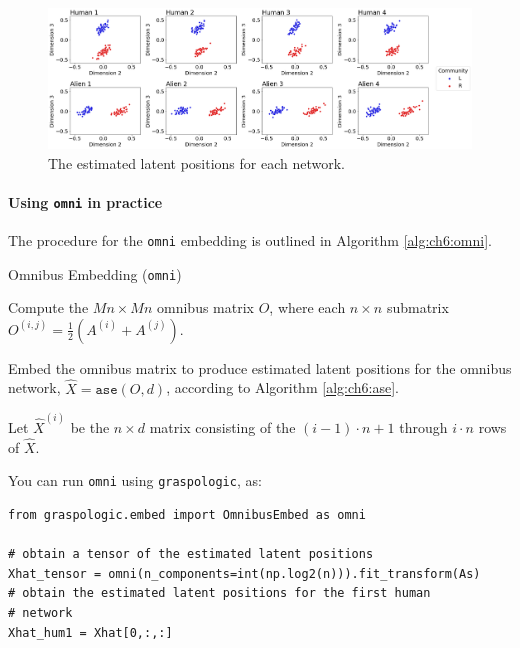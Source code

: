 \begin{figure}[h]
    \centering
    \includegraphics[width=\linewidth]{representations/ch6/Images/omni_ind.png}
    \caption[OMNI estimated latent positions]{The estimated latent positions for each network.}
    \label{fig:ch6:multinet:omni:individual}
\end{figure}

\paragraph*{Using \texttt{omni} in practice}

The procedure for the \texttt{omni} embedding is outlined in Algorithm \ref{alg:ch6:omni}. 



\begin{algorithm}[h]\caption{Omnibus Embedding (\texttt{omni})}
\label{alg:ch6:omni}
\SetAlgoLined

Compute the $Mn \times Mn$ omnibus matrix $O$, where each $n \times n$ submatrix $O^{(i,j)} = \frac{1}{2}\left(A^{(i)} + A^{(j)}\right)$.

Embed the omnibus matrix to produce estimated latent positions for the omnibus network, $\hat X = \texttt{ase}(O, d)$, according to Algorithm \ref{alg:ch6:ase}. 

Let $\hat X^{(i)}$ be the $n \times d$ matrix consisting of the $(i - 1)\cdot n + 1$ through $i\cdot n$ rows of $\hat X$.

\end{algorithm}

You can run \texttt{omni} using \texttt{graspologic}, as:

\begin{lstlisting}[style=python]
from graspologic.embed import OmnibusEmbed as omni

# obtain a tensor of the estimated latent positions
Xhat_tensor = omni(n_components=int(np.log2(n))).fit_transform(As)
# obtain the estimated latent positions for the first human
# network
Xhat_hum1 = Xhat[0,:,:]
\end{lstlisting}

